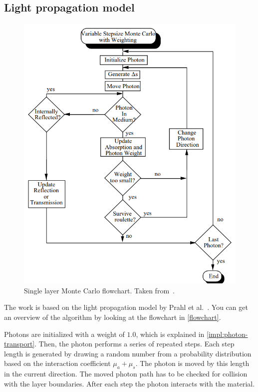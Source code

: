 \documentclass[]{article}
\begin{document}
\subsection{Light propagation model}

\begin{figure}[ht!]
	\includegraphics[width=\linewidth]{img/flowchart.png}
	\caption{Single layer Monte Carlo flowchart. Taken from~\cite{prahl89}.}
	\label{flowchart}
\end{figure}

The work is based on the light propagation model by Prahl et al.~\cite{prahl89}. You can get an overview of the algorithm by looking at the flowchart in \autoref{flowchart}.

Photons are initialized with a weight of $1.0$, which is explained in \autoref{impl:photon-transport}. Then, the photon performs a series of repeated steps. Each step length is generated by drawing a random number from a probability distribution based on the interaction coefficient $\mu_a+\mu_s$. The photon is moved by this length in the current direction. The moved photon path has to be checked for collision with the layer boundaries. After each step the photon interacts with the material.
\end{document}
